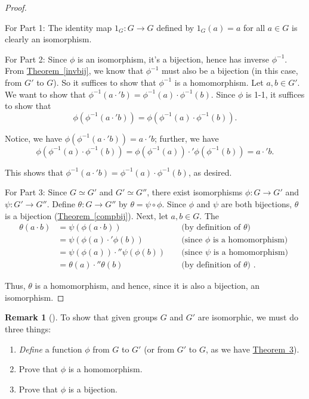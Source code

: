 \documentclass[10pt,]{book}
\theoremstyle{plain}
\theoremstyle{definition}
\theoremstyle{definition}
\newtheorem{remark}[theorem]{Remark}
\theoremstyle{definition}
\theoremstyle{definition}
\numberwithin{equation}{section}
\newcommand{\amp}{&}
\begin{document}
\begin{proof}\hypertarget{proof-16}{}
For Part 1: The identity map \(1_G:G\to G\) defined by \(1_G(a)=a\) for all \(a\in G\) is clearly an isomorphism.%
\par
For Part 2: Since \(\phi\) is an isomorphism, it's a bijection, hence has inverse \(\phi^{-1}\). From \hyperref[invbij]{Theorem~\ref{invbij}}, we know that \(\phi^{-1}\) must also be a bijection (in this case, from \(G'\) to \(G\)). So it suffices to show that \(\phi^{-1}\) is a homomorphism. Let \(a,b\in G'\). We want to show that \(\phi^{-1}(a\cdot'b)=\phi^{-1}(a)\cdot\phi^{-1}(b)\). Since \(\phi\) is 1-1, it suffices to show that%
\begin{equation*}
\phi(\phi^{-1}(a\cdot'b))=\phi(\phi^{-1}(a)\cdot\phi^{-1}(b)).
\end{equation*}
%
\par
Notice, we have \(\phi(\phi^{-1}(a\cdot'b))=a\cdot'b\); further, we have%
\begin{equation*}
\phi(\phi^{-1}(a)\cdot\phi^{-1}(b))=\phi(\phi^{-1}(a))\cdot'\phi(\phi^{-1}(b))=a\cdot'b.
\end{equation*}
%
\par
This shows that \(\phi^{-1}(a\cdot'b)=\phi^{-1}(a)\cdot\phi^{-1}(b)\), as desired.%
\par
For Part 3: Since \(G\simeq G'\) and \(G'\simeq G''\), there exist isomorphisms \(\phi:G\to G'\) and \(\psi:G'\to G''\). Define \(\theta:G\to G''\) by \(\theta=\psi \circ \phi\). Since \(\phi\) and \(\psi\) are both bijections, \(\theta\) is a bijection (\hyperref[compbij]{Theorem~\ref{compbij}}). Next, let \(a,b\in G\). The%
\begin{align*}
\theta(a\cdot b)\amp =\psi(\phi(a\cdot b))\amp \amp \text{ (by definition of \(\theta\)) }\\
\amp =\psi(\phi(a)\cdot'\phi(b))\amp \amp \text{ (since \(\phi\) is a homomorphism) }\\
\amp =\psi(\phi(a))\cdot''\psi(\phi(b))\amp \amp \text{ (since \(\psi\) is a homomorphism) }\\
\amp =\theta(a)\cdot''\theta(b)\amp \amp \text{ (by definition of \(\theta\)) } .
\end{align*}
%
\par
Thus, \(\theta\) is a homomorphism, and hence, since it is also a bijection, an isomorphism.%
\end{proof}
\begin{remark}[]\label{remark-17}
To show that given groups \(G\) and \(G'\) are isomorphic, we must do three things: \leavevmode%
\begin{enumerate}
\item\hypertarget{li-147}{}\emph{Define} a function \(\phi\) from \(G\) to \(G'\) (or from \(G'\) to \(G\), as we have \hyperref[groupisoequiv]{Theorem~3}).%
\item\hypertarget{li-148}{}Prove that \(\phi\) is a homomorphism.%
\item\hypertarget{li-149}{}Prove that \(\phi\) is a bijection.%
\end{enumerate}
%
\end{remark}
\end{document}
